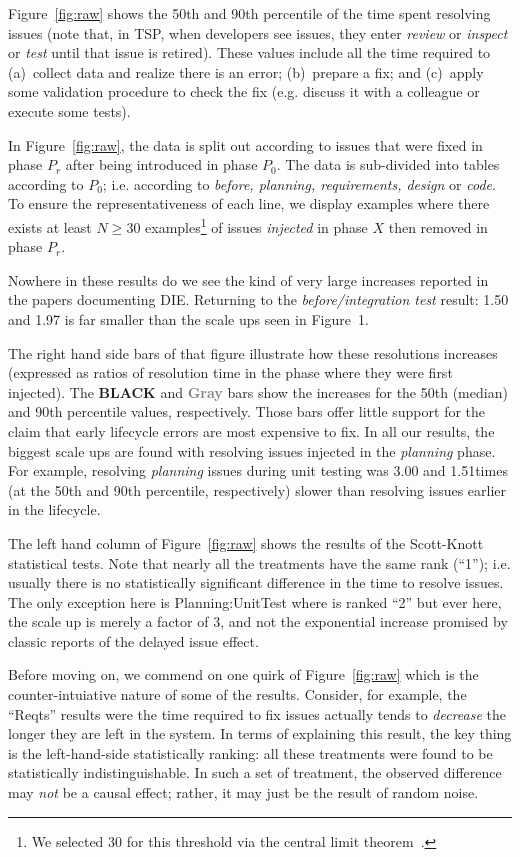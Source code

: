 \documentclass[smallcondensed]{svjour3}
\newcommand{\fig}[1]{Figure~\ref{fig:#1}}
\begin{document}
\fig{raw} shows the  50th and 90th percentile
of the time spent resolving issues
(note that, in TSP, when developers see issues, they enter {\em review} or 
{\em inspect} or {\em test}
until that issue is retired).
These values include all the time required  to (a)~collect data and realize there is an error;
(b)~prepare a fix;  and (c)~apply some validation
procedure to check the fix (e.g. discuss it with a colleague or execute some tests).


In \fig{raw}, the data is split out according to issues that were fixed in phase $P_r$ after
being introduced in phase $P_0$. The data is sub-divided into tables according to $P_0$;
i.e. according to {\em before, planning, requirements, design} or {\em  code}. 
To ensure the representativeness of each line, we display examples
where there exists at least $N\ge 30$ examples\footnote{We selected 30
for this threshold via the central limit theorem~\cite{maxwelldata}.} of issues {\em injected} in phase $X$ then
removed in phase $P_r$.

Nowhere in 
these results do we see the kind of very large increases reported in the papers
documenting DIE. Returning to
the {\em before/integration test} result: 1.50 and 1.97 is far smaller
than the scale ups seen in Figure~1. 


The right hand side bars of that figure
illustrate how these resolutions increases (expressed as ratios of resolution time in the phase where they were first injected).
The {\bf BLACK} and \textcolor{Gray}{{\bf Gray}} bars show the increases for the  50th (median) and 90th percentile values, respectively.
Those bars offer little support for the 
claim that early lifecycle errors are most expensive to fix.
In all our results, the biggest scale ups are found with resolving
issues injected in the {\em planning} phase. For example,
resolving {\em planning} issues during unit testing was 3.00 and 1.51times (at the 50th and 90th percentile, respectively)
slower than resolving issues earlier in the lifecycle. 

The left hand column of \fig{raw} shows the results of the Scott-Knott statistical tests. Note that nearly all
the treatments have the same rank (``1''); i.e. usually there is no statistically significant difference in the 
time to resolve issues. The only exception here is Planning:UnitTest where is ranked ``2'' but ever here, the scale up is merely
a factor of 3, and not the exponential increase promised by classic reports of the delayed issue effect.


Before moving on, we commend on one quirk of \fig{raw} which is the counter-intuiative
nature of some of the results. Consider, for example, the ``Reqts'' results were
the time required to fix issues actually tends to {\em decrease} the longer they are left in the system. In terms of explaining this result, the key thing is the left-hand-side statistically ranking: all these treatments were found to be statistically indistinguishable. In such a set of treatment, the observed
difference may {\em not} be a causal effect; rather, it may just
be the result of  random noise.
\end{document}
